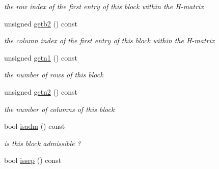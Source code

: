 \begin{DoxyCompactItemize}
\begin{DoxyCompactList}\small\item\em the row index of the first entry of this block within the \-H-\/matrix \end{DoxyCompactList}\item 
\hypertarget{classblcluster_a219be9487e16260d3ccae811e8d1680c}{
unsigned \hyperlink{classblcluster_a219be9487e16260d3ccae811e8d1680c}{getb2} () const }
\label{classblcluster_a219be9487e16260d3ccae811e8d1680c}

\begin{DoxyCompactList}\small\item\em the column index of the first entry of this block within the \-H-\/matrix \end{DoxyCompactList}\item 
\hypertarget{classblcluster_a9d0cb05a309f5f62153b2fd70cdfa15b}{
unsigned \hyperlink{classblcluster_a9d0cb05a309f5f62153b2fd70cdfa15b}{getn1} () const }
\label{classblcluster_a9d0cb05a309f5f62153b2fd70cdfa15b}

\begin{DoxyCompactList}\small\item\em the number of rows of this block \end{DoxyCompactList}\item 
\hypertarget{classblcluster_a855a545c85d1d57cf5e4625ca00545fe}{
unsigned \hyperlink{classblcluster_a855a545c85d1d57cf5e4625ca00545fe}{getn2} () const }
\label{classblcluster_a855a545c85d1d57cf5e4625ca00545fe}

\begin{DoxyCompactList}\small\item\em the number of columns of this block \end{DoxyCompactList}\item 
\hypertarget{classblcluster_ae76ce05ef24c720dcc504da61a70dbaf}{
bool \hyperlink{classblcluster_ae76ce05ef24c720dcc504da61a70dbaf}{isadm} () const }
\label{classblcluster_ae76ce05ef24c720dcc504da61a70dbaf}

\begin{DoxyCompactList}\small\item\em is this block admissible ? \end{DoxyCompactList}\item 
\hypertarget{classblcluster_a5005ca5e51e9e96db991f2385dc41ba1}{
bool \hyperlink{classblcluster_a5005ca5e51e9e96db991f2385dc41ba1}{issep} () const }
\label{classblcluster_a5005ca5e51e9e96db991f2385dc41ba1}


\end{DoxyCompactItemize}
